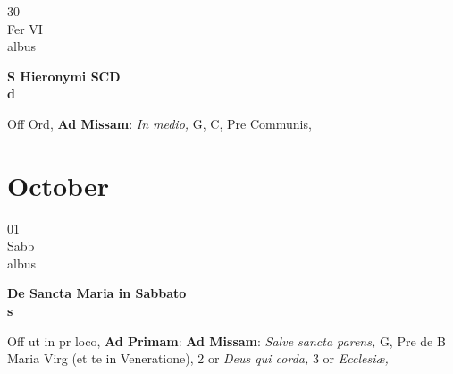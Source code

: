 \documentclass[10pt, openany]{book}
\begin{document}
        \begin{center}
            \begin{minipage}{3.5in}
                \vspace{2em}
                \begin{minipage}{0.5in}
                    {\Huge 30} \\
                    {\normalsize Fer VI} \\
                    {\normalsize albus}
                \end{minipage}
                \begin{minipage}{3.0in}
                    \textbf{ \large S Hieronymi SCD \\
                    \textnormal{\normalsize d}} \\ 
                \end{minipage}
                \begin{justify}Off Ord, \textbf{Ad Missam}: \textit{In medio,} G, C, Pre Communis,   
                \end{justify}
            \end{minipage}
        \end{center}
    
        \chapter{October}
                        
        \begin{center}
            \begin{minipage}{3.5in}
                \vspace{2em}
                \begin{minipage}{0.5in}
                    {\Huge 01} \\
                    {\normalsize Sabb} \\
                    {\normalsize albus}
                \end{minipage}
                \begin{minipage}{3.0in}
                    \textbf{ \large De Sancta Maria in Sabbato \\
                    \textnormal{\normalsize s}} \\ 
                \end{minipage}
                \begin{justify}Off ut in pr loco, \textbf{Ad Primam}: \textbf{Ad Missam}: \textit{Salve sancta parens,} G, Pre de B Maria Virg (et te in Veneratione), 2 or \textit{Deus qui corda,} 3 or \textit{Ecclesiæ,}   
                \end{justify}
            \end{minipage}
        \end{center}
    
\end{document}
